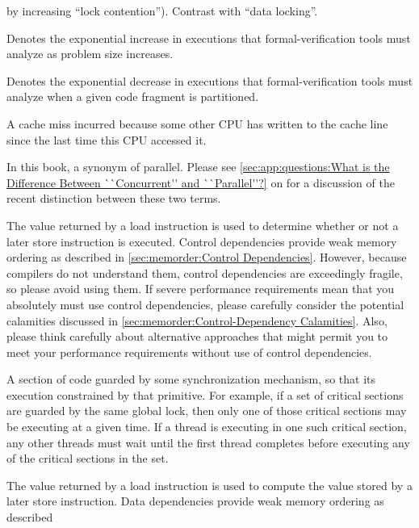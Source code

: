 \begin{description}
	by increasing ``lock contention'').
	Contrast with ``data locking''.
\item[\IXG{Combinatorial Explosion}:]
	Denotes the exponential increase in executions that
	formal-verification tools must analyze as problem size increases.
\item[\IXG{Combinatorial Implosion}:]
	Denotes the exponential decrease in executions that
	formal-verification tools must analyze when a given
	code fragment is partitioned.
\item[\IXGalth{Communication Miss}{communication}{cache miss}:]
	A cache miss incurred because some other CPU has written to
	the cache line since the last time this CPU accessed it.
\item[\IXG{Concurrent}:]
	In this book, a synonym of parallel.
	Please see \cref{sec:app:questions:What is the Difference Between ``Concurrent'' and ``Parallel''?}
	on 
	for a discussion of the recent distinction between these two
	terms.
\item[\IXGh{Control}{dependency}:]
	The value returned by a load instruction is used to determine
	whether or not a later store instruction is executed.
	Control dependencies provide weak memory ordering as described
	in \cref{sec:memorder:Control Dependencies}.
	However, because compilers do not understand them, control
	dependencies are exceedingly fragile, so please avoid using them.
	If severe performance requirements mean that you absolutely must
	use control dependencies, please carefully consider the potential
	calamities discussed in
	\cref{sec:memorder:Control-Dependency Calamities}.
	Also, please think carefully about alternative approaches that
	might permit you to meet your performance requirements without
	use of control dependencies.
\item[\IXG{Critical Section}:]
	A section of code guarded by some synchronization mechanism,
	so that its execution constrained by that primitive.
	For example, if a set of critical sections are guarded by
	the same global lock, then only one of those critical sections
	may be executing at a given time.
	If a thread is executing in one such critical section,
	any other threads must wait until the first thread completes
	before executing any of the critical sections in the set.
\item[\IXGh{Data}{dependency}:]
	The value returned by a load instruction is used to compute
	the value stored by a later store instruction.
	Data dependencies provide weak memory ordering as described

\end{description}
